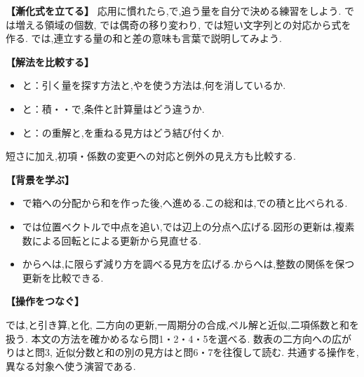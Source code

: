   \noindent\textbf{【漸化式を立てる】}
  応用に慣れたら,で,追う量を自分で決める練習をしよう.
  では増える領域の個数,
  では偶奇の移り変わり,
  では短い文字列との対応から式を作る.
  では,連立する量の和と差の意味も言葉で説明してみよう.

  \noindent\textbf{【解法を比較する】}
  \begin{itemize}
    \item {}と：引く量を探す方法と,やを使う方法は,何を消しているか.
    \item {}と：積・・で,条件と計算量はどう違うか.
    \item {}と：の重解と,を重ねる見方はどう結び付くか.
  \end{itemize}
  短さに加え,初項・係数の変更への対応と例外の見え方も比較する.

  \noindent\textbf{【背景を学ぶ】}
  \begin{itemize}
    \item {}で箱への分配から和を作った後,へ進める.この総和は,での積と比べられる.
    \item {}では位置ベクトルで中点を追い,では辺上の分点へ広げる.図形の更新は,複素数による回転とによる更新から見直せる.
    \item {}からへは,に限らず減り方を調べる見方を広げる.からへは,整数の関係を保つ更新を比較できる.
  \end{itemize}

  \noindent\textbf{【操作をつなぐ】}\par
  では,と引き算,と化,
  二方向の更新,一周期分の合成,ペル解と近似,二項係数と和を扱う.
  本文の方法を確かめるなら問1・2・4・5を選べる.
  数表の二方向への広がりはと問3,
  近似分数と和の別の見方はと問6・7を往復して読む.
  共通する操作を,異なる対象へ使う演習である.
